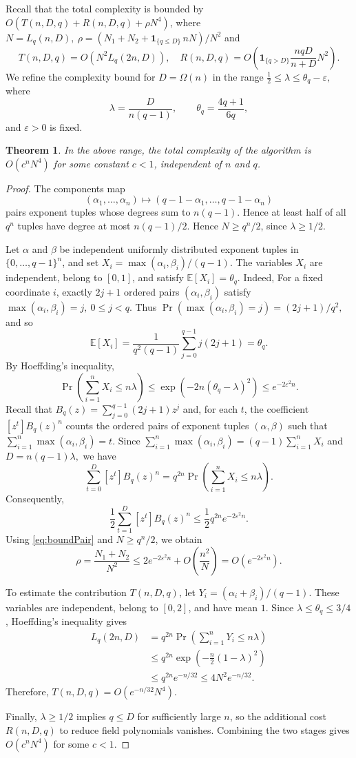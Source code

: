 \documentclass[a4paper, 12pt, oneside, openright]{article}
\newtheorem{thm}{Theorem}
\begin{document}
\medskip
Recall that the total complexity is bounded by $O(T(n,D,q)+R(n,D,q)+\rho N^4)$, where $N=L_q(n,D),\ \rho = (N_1+N_2+\mathbf{1}_{\{q\le D\}}\,nN)/N^2$ and
\[
T(n,D,q)=
O\left(N^2L_q(2n,D)\right),
\quad
R(n,D,q)=
O\left(\mathbf 1_{\{q>D\}}\frac{nqD}{n+D}N^2\right).
\]
We refine the complexity bound for $D=\Omega(n)$ in the range $\frac12\le\lambda\le\theta_q-\varepsilon,$ where
\[
\lambda=\frac{D}{n(q-1)},\qquad
\theta_q=\frac{4q+1}{6q},
\]
and $\varepsilon>0$ is fixed.



\begin{thm}\label{thm:complLargeD}
In the above range, the total complexity of the algorithm is $O(c^nN^4)$ for some constant $c<1$, independent of $n$ and $q$.
\end{thm}

\begin{proof}
The components map
\[
(\alpha_1,\ldots,\alpha_n)\mapsto
(q-1-\alpha_1,\ldots,q-1-\alpha_n)
\]
pairs exponent tuples whose degrees sum to $n(q-1)$.
Hence at least half of all $q^n$ tuples have degree at most $n(q-1)/2$. Hence $N\ge q^n/2$, since $\lambda\ge1/2$.

Let $\alpha$ and $\beta$ be independent uniformly distributed exponent tuples in $\{0,\ldots,q-1\}^n$, and set $X_i=\max(\alpha_i,\beta_i)/(q-1)$. The variables $X_i$ are independent, belong to $[0,1]$, and satisfy $\mathbb E[X_i]=\theta_q$. Indeed, For a fixed coordinate $i$, exactly $2j+1$ ordered pairs $(\alpha_i,\beta_i)$ satisfy $\max(\alpha_i,\beta_i)=j,\ 0\le j<q$. Thus $\Pr(\max(\alpha_i,\beta_i)=j)=(2j+1)/q^2,$ and so
\[
\mathbb E[X_i]=
\frac1{q^2(q-1)}
\sum_{j=0}^{q-1}j(2j+1)
=\theta_q.
\]
By Hoeffding's inequality,
\[
\Pr\left(\sum_{i=1}^n X_i\le n\lambda\right)
\le \exp\left(-2n(\theta_q-\lambda)^2\right)
\le e^{-2\varepsilon^2n}.
\]
Recall that $B_q(z)=\sum_{j=0}^{q-1}(2j+1)z^j$ and, for each $t$, the coefficient $[z^t]B_q(z)^n$ counts the ordered pairs of exponent tuples $(\alpha,\beta)$ such that $\sum_{i=1}^n\max(\alpha_i,\beta_i)=t.$
Since $\sum_{i=1}^n\max(\alpha_i,\beta_i)=(q-1)\sum_{i=1}^n X_i$ and $D=n(q-1)\lambda,$ we have
\[
\sum_{t=0}^D[z^t]B_q(z)^n=q^{2n}\Pr\left(\sum_{i=1}^n X_i\le n\lambda\right).
\]
Consequently,
\[
\frac12\sum_{t=1}^D[z^t]B_q(z)^n
\le \frac12q^{2n}e^{-2\varepsilon^2n}.
\]
Using \eqref{eq:boundPair} and $N\ge q^n/2$, we obtain
\[
\rho=\frac{N_1+N_2}{N^2}
\le 2e^{-2\varepsilon^2n}
+O\left(\frac{n^2}{N}\right)
=O(e^{-2\varepsilon^2n}).
\]

To estimate the contribution $T(n,D,q)$, let $Y_i=(\alpha_i+\beta_i)/(q-1)$. These variables are independent, belong to $[0,2]$, and have mean $1$. Since $\lambda\le\theta_q\le3/4$, Hoeffding's inequality gives
\[
\begin{aligned}
L_q(2n,D)
&=q^{2n}\Pr\left(
\sum_{i=1}^nY_i\le n\lambda
\right)\\
&\le q^{2n}
\exp\left(-\frac{n}{2}(1-\lambda)^2\right)\\
&\le q^{2n}e^{-n/32}
\le 4N^2e^{-n/32}.
\end{aligned}
\]
Therefore, $T(n,D,q)=O(e^{-n/32}N^4).$

Finally, $\lambda\ge1/2$ implies $q\le D$ for sufficiently large $n$, so the additional cost $R(n,D,q)$ to reduce field polynomials vanishes. Combining the two stages gives $O(c^nN^4)$ for some $c<1$.
\end{proof}
\end{document}
